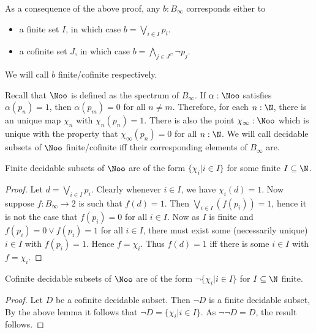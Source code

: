 \begin{remark}\label{AppendixCofiniteOrFinite}
  As a consequence of the above proof, any $b:B_\infty$ corresponds either to 
  \begin{itemize}
    \item a finite set $I$, in which case $b = \bigvee_{i\in I} p_i$. 
    \item a cofinite set $J$, in which case $b = \bigwedge_{j\in J^C} \neg p_j$. 
  \end{itemize}
  We will call $b$ finite/cofinite respectively. 
\end{remark}
\begin{remark}
Recall that $\Noo$ is defined as the spectrum of $B_\infty$. 
If $\alpha:\Noo$ satisfies $\alpha(p_n) = 1$, then $\alpha(p_m) = 0$ for all $n\neq m$. 
Therefore, for each $n:\N$, there is an unique map $\chi_n$ with $\chi_n(p_n) = 1$. 
There is also the point $\chi_\infty : \Noo$ which is unique 
with the property that $ \chi_\infty(p_n) = 0$ for all $n:\N$. 
We will call decidable subsets of $\Noo$ finite/cofinite iff their corresponding elements of $B_\infty$ are. 
\end{remark}
\begin{lemma}\label{FiniteDecidableSubsetsCharacterization}
  Finite decidable subsets of $\Noo$ are of the form 
  $\{\chi_i | i \in I\}$ for some finite $I\subseteq \N$. 
\end{lemma}
\begin{proof}
  Let $d= \bigvee_{i\in I} p_i$. 
  Clearly whenever $i\in I$, we have $\chi_i(d) = 1$. 
%
  Now suppose $f:B_\infty \to 2$ is such that $f(d) = 1$. 
  Then $\bigvee_{i\in I}(f(p_i)) = 1$, hence it is not the case that $f(p_i) = 0$ for all $i\in I$. 
  Now as $I$ is finite and $f(p_i) = 0 \vee f(p_i) = 1$ for all $i\in I$, 
  there must exist some (necessarily unique) $i\in I$ with $f(p_i) = 1$. Hence $f = \chi_i$. 
%
  Thus $f(d) = 1$ iff there is some $i\in I$ with $f = \chi_i$. 
\end{proof}
\begin{corollary}\label{CoFiniteDecidableSubsetsCharacterization}
  Cofinite decidable subsets of $\Noo$ are of the form
  $\neg \{\chi_i | i \in I\}$ for $I\subseteq\N$ finite. 
\end{corollary}
\begin{proof}
  Let $D$ be a cofinite decidable subset. Then $\neg D$ is a finite decidable subset, 
  By the above lemma it follows that $\neg D = \{\chi_i | i\in I\}$. 
  As $\neg \neg D = D$, the result follows. 
\end{proof}
